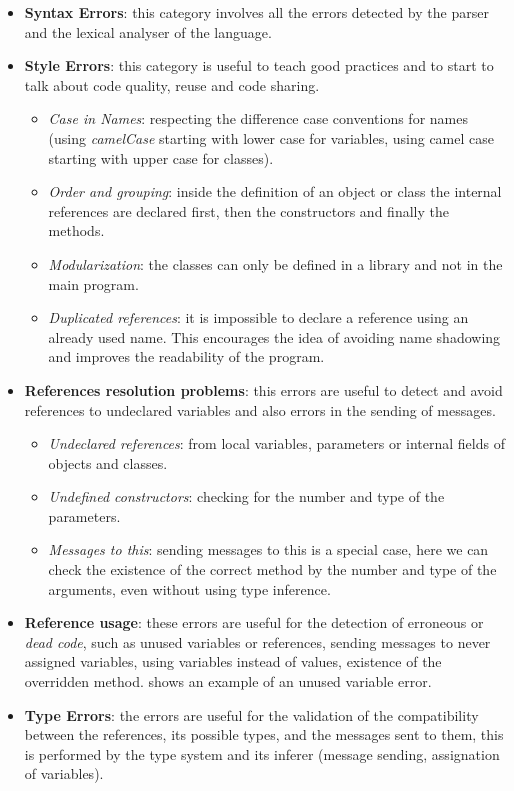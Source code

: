 \begin{itemize}
  \item \textbf{Syntax Errors}: this category involves all the errors detected by the parser and the lexical analyser of the language.
  \item \textbf{Style Errors}: this category is useful to teach good practices and to start to talk about code quality, reuse and code sharing.
	\begin{itemize}
		\item \textit{Case in Names}: respecting the difference case conventions for
		names (\eg using \textit{camelCase} starting with lower case for variables,
		using camel case starting with upper case for classes).
		\item \textit{Order and grouping}: inside the definition of an object or class the internal references are declared first, then the constructors and finally the methods.
		\item \textit{Modularization}: the classes can only be defined in a library and not in the main program.		
		\item \textit{Duplicated references}: it is impossible to declare a reference using an already used name. 
			This encourages the idea of avoiding name shadowing and improves the readability of the program.
	\end{itemize}
  \item \textbf{References resolution problems}: this errors are useful to detect and avoid references to undeclared variables and also errors in the sending of messages.
  
	\begin{itemize}
	  \item \textit{Undeclared references}: from local variables, parameters or internal fields of objects and classes.
	  \item \textit{Undefined constructors}: checking for the number and type of the parameters.
	  \item \textit{Messages to this}: sending messages to this is a special case, here we can check the existence of the correct method by the number and type of the arguments, even without using type inference.
	\end{itemize}
	
  \item \textbf{Reference usage}: 
		these errors are useful for the detection of erroneous or \textit{dead code}, such as unused variables or references, 
		sending messages to never assigned variables, using variables instead of values, existence of the overridden method.
		 shows an example of an unused variable error.

  \item \textbf{Type Errors}: the errors are useful for the validation of the compatibility between the references, its possible types, and the messages sent to them, this is performed by the type system and its inferer (\eg message sending, assignation of variables).
\end{itemize}

